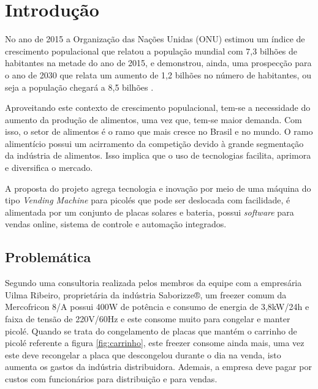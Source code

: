 \chapter{Introdução}

 No ano de 2015 a Organização das Nações Unidas (ONU) estimou um índice  de crescimento populacional que relatou a população mundial com 7,3 bilhões de habitantes na metade do ano de 2015, e  demonstrou, ainda, uma prospecção para o ano de 2030 que relata um aumento de 1,2 bilhões no número de habitantes, ou seja a população chegará a
8,5 bilhões \cite {ONU}. 

Aproveitando este contexto de crescimento populacional, tem-se a necessidade do aumento da produção de alimentos, uma vez que, tem-se maior demanda. Com isso, o setor de alimentos é o ramo que mais cresce no Brasil e no mundo. O ramo alimentício possui um acirramento da competição devido à grande segmentação da indústria de alimentos. Isso implica que o uso de tecnologias facilita, aprimora e diversifica o mercado. \cite{IBIA}

A proposta do projeto agrega tecnologia e inovação por meio de uma máquina do tipo \textit{Vending Machine} para picolés que pode ser deslocada com facilidade, é alimentada por um conjunto de placas solares e bateria, possui \textit{software} para vendas online, sistema de controle e automação integrados.

\section{Problemática}

Segundo uma consultoria realizada pelos membros da equipe com a empresária Uilma Ribeiro, proprietária da indústria Saborizze®, um freezer comum da Mercofricon 8/A possui 400W de potência e consumo de energia de 3,8kW/24h e faixa de tensão de 220V/60Hz e este consome muito para congelar e manter picolé. Quando se trata do congelamento de placas que mantém o carrinho de picolé referente a figura \ref{fig:carrinho}, este freezer consome ainda mais, uma vez este deve recongelar a placa que descongelou durante o dia na venda, isto aumenta os gastos da indústria distribuidora. Ademais, a empresa deve pagar por custos com funcionários para distribuição e para vendas. 

